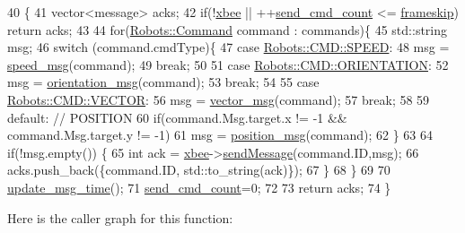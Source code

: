 \begin{DoxyCode}
40                                                                               \{
41     vector<message> acks;
42     \textcolor{keywordflow}{if}(!\hyperlink{class_flying_messenger_a419820a45ea2bc496c10bf36b7b49033}{xbee} || ++\hyperlink{class_flying_messenger_ac9ea18cccb4b2495daa5f90ba5aff1ab}{send\_cmd\_count} <= \hyperlink{class_flying_messenger_af2bf887194a8483cbadb5e27d2ec6b58}{frameskip}) \textcolor{keywordflow}{return} acks;
43 
44     \textcolor{keywordflow}{for}(\hyperlink{struct_robots_1_1_command}{Robots::Command} command : commands)\{
45         std::string msg;
46         \textcolor{keywordflow}{switch} (command.cmdType)\{
47             \textcolor{keywordflow}{case} \hyperlink{serial_w_8hpp_aac3553b3932cbfeeac4526ce7ca0336b}{Robots::CMD::SPEED}:
48                 msg = \hyperlink{class_flying_messenger_a9d374308f6134d5a5ed5cf3275745301}{speed\_msg}(command);
49                 \textcolor{keywordflow}{break};
50 
51             \textcolor{keywordflow}{case} \hyperlink{serial_w_8hpp_ac815b03ec48abf99301f44140ff0b0a9}{Robots::CMD::ORIENTATION}:
52                 msg = \hyperlink{class_flying_messenger_a33d01541e04f6f2440c2828e49722ed4}{orientation\_msg}(command);
53                 \textcolor{keywordflow}{break};
54 
55             \textcolor{keywordflow}{case} \hyperlink{serial_w_8hpp_ac6e89954deaa373db52a91ac6db50884}{Robots::CMD::VECTOR}:
56                 msg = \hyperlink{class_flying_messenger_a1d4e86acb2f76d531f869f28e200d6c3}{vector\_msg}(command);
57                 \textcolor{keywordflow}{break};
58 
59             \textcolor{keywordflow}{default}: \textcolor{comment}{// POSITION}
60                 \textcolor{keywordflow}{if}(command.Msg.target.x != -1 && command.Msg.target.y != -1)
61                     msg = \hyperlink{class_flying_messenger_a72e6aebf3bf1dba3b053a1f2a0fb13f6}{position\_msg}(command);
62         \}
63 
64         \textcolor{keywordflow}{if}(!msg.empty()) \{
65             \textcolor{keywordtype}{int} ack = \hyperlink{class_flying_messenger_a419820a45ea2bc496c10bf36b7b49033}{xbee}->\hyperlink{class_serial_com_a0a371f0bf00f14bcf6ef23c752276144}{sendMessage}(command.ID,msg);
66             acks.push\_back(\{command.ID, std::to\_string(ack)\});
67         \}
68     \}
69     
70     \hyperlink{class_flying_messenger_a0bcca6b75e89b91681685da9f7bc54f1}{update\_msg\_time}();
71     \hyperlink{class_flying_messenger_ac9ea18cccb4b2495daa5f90ba5aff1ab}{send\_cmd\_count}=0;
72 
73     \textcolor{keywordflow}{return} acks;
74 \}
\end{DoxyCode}
Here is the caller graph for this function\+:
\mbox{\label{class_flying_messenger_adc63fb3138c384505382a170729c5c1c}} 
